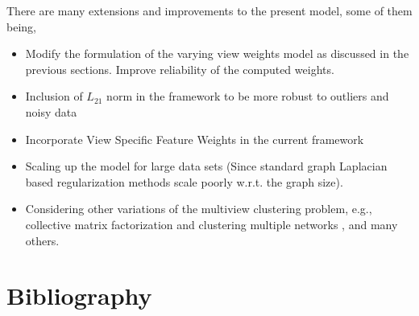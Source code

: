 \documentclass[a4paper]{article}
\begin{document}
	There are many extensions and improvements to the present model, some of them being,
	\begin{itemize}
		\item Modify the formulation of the varying view weights model as discussed in the previous sections. Improve reliability of the computed weights.
		\item Inclusion of $L_{21}$ norm in the framework to be more robust to outliers and noisy data \cite{huang2014robust}
		\item Incorporate View Specific Feature Weights in the current framework \cite{wang2013multi}
		\item Scaling up the model for large data sets (Since standard graph Laplacian based regularization methods scale poorly w.r.t. the graph size).
		\item Considering other variations of the multiview clustering problem, e.g., collective matrix factorization \cite{bouchard2013convex} and clustering multiple networks \cite{ni2015flexible}, and many others.	
	\end{itemize}		
	
	\pagebreak	
	
	\section{Bibliography}	
	
	

		
	
\end{document}
